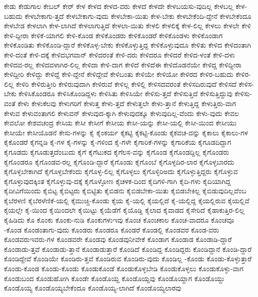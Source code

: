 {ಕೇಡು
ಕೇಡುಗಾಲ
ಕೇಬಲ್
ಕೇರ್
ಕೇಳ
ಕೇಳದ
ಕೇಳದ-ವರು
ಕೇಳದೆ
ಕೇಳದೇ
ಕೇಳಬಯಸು-ವುದಿಲ್ಲ
ಕೇಳಬಲ್ಲ
ಕೇಳ-ಬಹುದು
ಕೇಳಬೇಕಾಗು-ತ್ತದೆ
ಕೇಳಬೇಕಾಗು-ವುದು
ಕೇಳಬೇಕಾ-ಯಿತು
ಕೇಳ-ಬೇಕು
ಕೇಳಬೇಕೆಂದಿ-ದ್ದೇನೆ
ಕೇಳಬೇಕೆಂದೂ
ಕೇಳಬೇಡ
ಕೇಳಲಾಗಿ
ಕೇಳ-ಲಾಗಿದೆ
ಕೇಳಲಾಗುತ್ತಿದೆ
ಕೇಳಲಾ-ಯಿತು
ಕೇಳಲಿ
ಕೇಳಲಿಕ್ಕೆ
ಕೇಳ-ಲಿಲ್ಲ
ಕೇಳಲು
ಕೇಳಲೇ
ಕೇಳಿ
ಕೇಳಿ-ದ್ದೀರಾ
ಕೇಳಿಕೆ-ಯಾಗಲಿ
ಕೇಳಿ-ಕೊಂಡ
ಕೇಳಿಕೊಂಡರು
ಕೇಳಿಕೊಂಡರೆ
ಕೇಳಿಕೊಂಡಳು
ಕೇಳಿಕೊಂಡಾಗ
ಕೇಳಿಕೊಂಡಿತು
ಕೇಳಿಕೊಂಡಿ-ದ್ದಾರೆ
ಕೇಳಿಕೊಳ್ಳ-ಬೇಕು
ಕೇಳಿಕೊಳ್ಳುತ್ತಿದ್ದ
ಕೇಳಿಕೊಳ್ಳುವುದೂ
ಕೇಳಿತು
ಕೇಳಿದ
ಕೇಳಿದಂತಾಗಿ
ಕೇಳಿ-ದಂತೆ
ಕೇಳಿ-ದಕ್ಕೆ
ಕೇಳಿದಭಗವಾನ್
ಕೇಳಿದರಂತೆ
ಕೇಳಿ-ದರು
ಕೇಳಿದರೂ
ಕೇಳಿದರೆ
ಕೇಳಿದ-ಳಂತೆ
ಕೇಳಿ-ದಳು
ಕೇಳಿದವ-ರಲ್ಲ
ಕೇಳಿದವಳಾಗಿರ-ಲಿಲ್ಲ
ಕೇಳಿದಾ
ಕೇಳಿ-ದಾಗ
ಕೇಳಿದೆ
ಕೇಳಿದೆಈ
ಕೇಳಿದೊಡನೆಯೇ
ಕೇಳಿದ್ದ
ಕೇಳಿದ್ದೀರಾ
ಕೇಳಿದ್ದೀರಿ
ಕೇಳಿದ್ದು
ಕೇಳಿದ್ದೆ
ಕೇಳಿ-ದ್ದೇನೆ
ಕೇಳಿದ್ದೇವೆ
ಕೇಳಿಬಂತು
ಕೇಳಿಯೇ
ಕೇಳಿಯೋ
ಕೇಳಿರದ
ಕೇಳಿರ-ಬಹುದು
ಕೇಳಿರ-ಲಿಲ್ಲ
ಕೇಳಿರಿ
ಕೇಳಿರುತ್ತೀರಿ
ಕೇಳಿರುವುದಾಗಿ
ಕೇಳಿರುವೆ
ಕೇಳಿಲ್ಲ
ಕೇಳಿಲ್ಲಿ
ಕೇಳಿಸದವರಂತೆ
ಕೇಳಿಸದಿರುವುದೆ
ಕೇಳಿಸದೆ
ಕೇಳಿಸ-ಬೇಕು
ಕೇಳಿಸಿಕೊಂಡರೂ
ಕೇಳಿಸಿಕೊಂಡಿದ್ದಳು
ಕೇಳಿಸಿತು
ಕೇಳಿಸಿಯೇ
ಕೇಳಿಸು-ತ್ತದೆ
ಕೇಳಿಸುತ್ತಿದೆ
ಕೇಳಿಸುತ್ತಿದ್ದುವು
ಕೇಳಿಸು-ವಂತೆ
ಕೇಳು
ಕೇಳುಕೆಲವು
ಕೇಳುಗರಿಗೆ
ಕೇಳುತ್ತ
ಕೇಳು-ತ್ತದೆ
ಕೇಳುತ್ತಲೇ
ಕೇಳು-ತ್ತಾನೆ
ಕೇಳುತ್ತಿದ್ದ
ಕೇಳುತ್ತಿರು-ವಾಗ
ಕೇಳುವ
ಕೇಳುವಂತಾಗಲಿ
ಕೇಳುವನ್
ಕೇಳುವುದ-ಕ್ಕಾಗಿ
ಕೇಳುವುದಕ್ಕೂ
ಕೇಳುವುದಿಲ್ಲ-ವೆಂದು
ಕೇಳು-ವುದು
ಕೇವಲ
ಕೇವಲೋ
ಕೇಶವಚಂದ್ರ
ಕೇಸಿಯ
ಕೇಸೀ
ಕೇಸೀಗೆ
ಕೇಸೀಯ
ಕೇಸೀ-ಯನ್ನು
ಕೇಸೀ-ಯಲ್ಲಿ
ಕೇಸೀ-ಯಿಂದ
ಕೇಸೀಯು
ಕೇಸೀಯೇ
ಕೇಸೀಯೊಡನೆ
ಕೇಸು-ಗಳನ್ನು
ಕೈ
ಕೈಂಕರ್ಯ
ಕೈಕಟ್ಟಿ
ಕೈಕಟ್ಟಿ-ಕೊಂಡು
ಕೈಕವಚ-ವನ್ನು
ಕೈಕಾಲು
ಕೈಕಾಲು-ಗಳ
ಕೈಕೊಂಡರೆ
ಕೈಗನ್ನಡಿ
ಕೈ-ಗಳ
ಕೈ-ಗಳನ್ನು
ಕೈ-ಗಳಿಂದ
ಕೈ-ಗಳೇ
ಕೈಗಾರಿಕೆ-ಗಳನ್ನು
ಕೈಗಾರಿಕೆಯ
ಕೈಗೂಡದಿದ್ದಾಗ
ಕೈಗೂಡದು
ಕೈಗೂಡುತ್ತದೆಂಬುದು
ಕೈಗೆ
ಕೈಗೆಟುಕದ
ಕೈಗೆಲಸ-ವನ್ನು
ಕೈಗೊಂಡ
ಕೈಗೊಂಡದ್ದಿಲ್ಲ
ಕೈಗೊಂಡರು
ಕೈಗೊಂಡರೂ
ಕೈಗೊಂಡವ-ರಲ್ಲ
ಕೈಗೊಂಡಿ-ದ್ದಾರೆ
ಕೈಗೊಂಡು
ಕೈಗೊಂಬೆ
ಕೈಗೊಳ್ಳದಿರ-ಲಾರ
ಕೈಗೊಳ್ಳಬಾರದು
ಕೈಗೊಳ್ಳಬೇಕಾಗಿದೆ
ಕೈಗೊಳ್ಳಬೇಕೆಂದು
ಕೈಗೊಳ್ಳ-ಲಿಲ್ಲ
ಕೈಗೊಳ್ಳಲು
ಕೈಗೊಳ್ಳಿರಿಅದು
ಕೈಗೊಳ್ಳುತ್ತಿದ್ದರು
ಕೈಗೊಳ್ಳುವ
ಕೈಗೊಳ್ಳುವುದಕ್ಕಿಂತ
ಕೈಗೊಳ್ಳುವು-ದಕ್ಕೆ
ಕೈಗೊಳ್ಳೋಣ
ಕೈಚಳಕ-ದಿಂದ
ಕೈದಿಗಳಿ-ಗಾಗಿ
ಕೈದಿ-ಗಳು
ಕೈದಿಯಾಗಿದ್ದ
ಕೈದೀವಿಗೆಯಿಂದು
ಕೈಬಿಟ್ಟ
ಕೈಬಿಟ್ಟರು
ಕೈಬಿಟ್ಟಿತು
ಕೈಬಿಡನು
ಕೈಬಿಡಬೇಕಾ-ಯಿತು
ಕೈಬಿಡಬೇಕಿಲ್ಲ
ಕೈಬಿಡುವುದಿಲ್ಲವೆಂಬ
ಕೈಬೆರಳಣಿ
ಕೈಬೆರಳೆಣಿಕೆ-ಯಲ್ಲಿ
ಕೈಮುಚ್ಚಿ-ಕೊಂಡು
ಕೈಯ
ಕೈ-ಯಲ್ಲಿ
ಕೈಯಲ್ಲಿದೆ
ಕೈ-ಯಲ್ಲಿದ್ದ
ಕೈಯಲ್ಲಿರುವ
ಕೈಯಲ್ಲಿವೆ
ಕೈಯಲ್ಲೇ
ಕೈ-ಯಿಂದ
ಕೈಯಿಂದಲೇ
ಕೈಯಿಟ್ಟು
ಕೈಯೆಡೆಗೆ
ಕೈಯೊಡ್ಡಿ
ಕೈಲಾದ
ಕೈವಾಡದ
ಕೈಸೇರಿದೆ
ಕೈಹಾಕುತ್ತಿರ-ಲಿಲ್ಲ
ಕೈಹಿಡಿದು
ಕೊ
ಕೊಂಕು
ಕೊಂಕು-ನುಡಿ
ಕೊಂಕುಗಳುಇವು
ಕೊಂಚ
ಕೊಂಚಕಾಲ
ಕೊಂಚ-ವಾದರೂ
ಕೊಂಚವೂ
-ಕೊಂಡ
ಕೊಂಡಂತಾಗು-ವುದು
ಕೊಂಡರು
ಕೊಂಡರೂ
ಕೊಂಡರೆ
ಕೊಂಡಲ್ಲಿ
ಕೊಂಡವರ
ಕೊಂಡ-ವರು
ಕೊಂಡವರುಇವರು-ಗಳ
ಕೊಂಡವರೇ
ಕೊಂಡವು
ಕೊಂಡವುನೀವೇಕೆ
ಕೊಂಡಾಗ
ಕೊಂಡಾಡ
ಕೊಂಡಾಡಿ-ದ್ದಾರೆ
ಕೊಂಡಾಡು-ತ್ತವೆ
ಕೊಂಡಾಡು-ತ್ತಾನೆ
ಕೊಂಡಾಡುತ್ತಾರೆ
ಕೊಂಡಿದೆ
ಕೊಂಡಿದ್ದ
ಕೊಂಡಿದ್ದರು
ಕೊಂಡಿದ್ದಾನೆ
ಕೊಂಡಿ-ದ್ದಾರೆ
ಕೊಂಡಿದ್ದೇವೆ
ಕೊಂಡಿಯೇ
ಕೊಂಡಿರು-ತ್ತವೆ
ಕೊಂಡಿರುವ
ಕೊಂಡಿರು-ವುದು
ಕೊಂಡಿಲ್ಲ
-ಕೊಂಡು
ಕೊಂಡು-ಕೊಳ್ಳುತ್ತಾರೆ
ಕೊಂಡು-ಕೊಂಡ
ಕೊಂಡು-ಕೊಂಡು
ಕೊಂಡುಕೊಂಡೆ
ಕೊಂಡುಕೊಳ್ಳಬೇಡಿ
ಕೊಂಡುಕೊಳ್ಳಲು
ಕೊಂಡುಕೊಳ್ಳು-ವಾಗ
ಕೊಂಡುಬಂದ
ಕೊಂಡುಹೋಗಿ
ಕೊಂಡೇ
ಕೊಂಡೊಯ್ದ
ಕೊಂಡೊಯ್ದವು
ಕೊಂಡೊಯ್ದಾಗ
ಕೊಂಡೊಯ್ದು
ಕೊಂಡೊಯ್ಯ
ಕೊಂಡೊಯ್ಯಬೇಕೆಂದೂ
ಕೊಂಡೊಯ್ಯ-ಲಾಗಿದೆ
ಕೊಂಡೊಯ್ಯಲಾರವು
}
